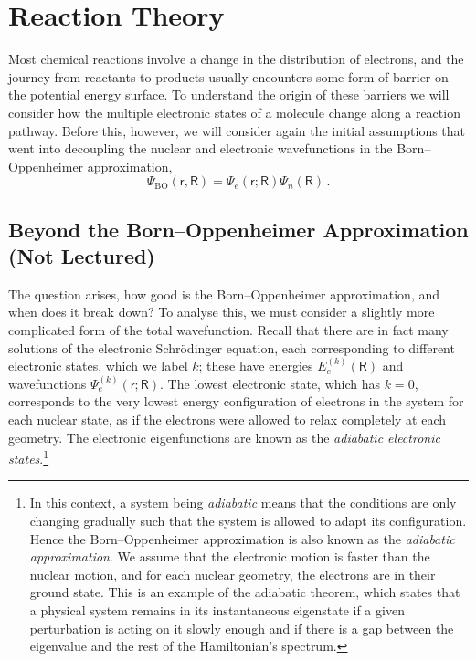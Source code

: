 \documentclass{article}
\theoremstyle{plain}\theoremheaderfont{\normalfont\itshape}\theorembodyfont{\rmfamily}\theoremseparator{.}\newtheorem*{rem}{Remark}\newtheorem*{ex}{Example}\newtheorem*{proof}{Proof}\newtheorem*{altp}{Alternative proof}
\theoremstyle{plain}\theoremheaderfont{\normalfont\bfseries}\theorembodyfont{\rmfamily}\theoremseparator{.}\newtheorem{thm}{Theorem}[section]\newtheorem{lem}[thm]{Lemma}\newtheorem{prop}[thm]{Proposition}\newtheorem*{cor}{Corollary}\newtheorem{defn}[thm]{Definition}\newtheorem{clm}[thm]{Claim}\newtheorem{clminproof}{Claim}\newtheorem{pos}{Postulate}[section]
\theoremstyle{break}\theoremheaderfont{\normalfont\itshape}\theorembodyfont{\rmfamily}\theoremseparator{.\medskip}\newtheorem*{proofskip}{Proof}\newtheorem*{exs}{Examples}\newtheorem*{rems}{Remarks}
\theoremstyle{break}\theoremheaderfont{\normalfont\bfseries}\theorembodyfont{\rmfamily}\theoremseparator{.\medskip}\newtheorem{lemskip}[thm]{Lemma}\newtheorem{defnskip}[thm]{Definition}\newtheorem{propskip}[thm]{Proposition}\newtheorem{thmskip}[thm]{Theorem}
\numberwithin{equation}{section}
\begin{document}
    \section{Reaction Theory}
    Most chemical reactions involve a change in the distribution of electrons, and the journey from reactants to products usually encounters some form of barrier on the potential energy surface. To understand the origin of these barriers we will consider how the multiple electronic states of a molecule change along a reaction pathway. Before this, however, we will consider again the initial assumptions that went into decoupling the nuclear and electronic wavefunctions in the Born--Oppenheimer approximation,
    \begin{equation}
        \Psi_{\text{BO}}(\mathsf{r},\mathsf{R})=\Psi_{e}(\mathsf{r};\mathsf{R})\Psi_n(\mathsf{R})\,.
    \end{equation}

    \subsection{Beyond the Born--Oppenheimer Approximation (Not Lectured)}
    The question arises, how good is the Born--Oppenheimer approximation, and when does it break down? To analyse this, we must consider a slightly more complicated form of the total wavefunction. Recall that there are in fact many solutions of the electronic Schrödinger equation, each corresponding to different electronic states, which we label \(k\); these have energies \(E_{e}^{(k)}(\mathsf{R})\) and wavefunctions \(\Psi_{e}^{(k)}(\mathsf{r};\mathsf{R})\). The lowest electronic state, which has \(k=0\), corresponds to the very lowest energy configuration of electrons in the system for each nuclear state, as if the electrons were allowed to relax completely at each geometry. The electronic eigenfunctions are known as the \textit{adiabatic electronic states}.\footnote{In this context, a system being \textit{adiabatic} means that the conditions are only changing gradually such that the system is allowed to adapt its configuration. Hence the Born--Oppenheimer approximation is also known as the \textit{adiabatic approximation}. We assume that the electronic motion is faster than the nuclear motion, and for each nuclear geometry, the electrons are in their ground state. This is an example of the adiabatic theorem, which states that a physical system remains in its instantaneous eigenstate if a given perturbation is acting on it slowly enough and if there is a gap between the eigenvalue and the rest of the Hamiltonian's spectrum.}
\end{document}
